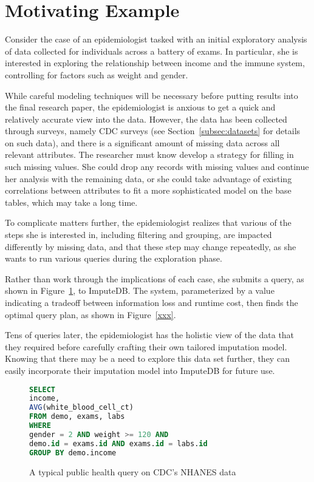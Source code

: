 \section{Motivating Example}
Consider the case of an epidemiologist tasked with an initial
exploratory analysis of data collected for individuals across
a battery of exams. In particular, she is interested in exploring
the relationship between income and the immune system,
controlling for factors such as weight and gender.

While careful modeling techniques will be necessary before putting
results into the final research paper, the epidemiologist is anxious
to get a quick and relatively accurate view into the data. However,
the data has been collected through surveys, namely CDC surveys (see Section~\ref{subsec:datasets} for details on such data),
and there is a significant amount of missing data across all
relevant attributes. The researcher must know develop a strategy
for filling in such missing values. She could drop any records with
missing values and continue her analysis with the remaining data,
or she could take advantage of existing correlations between attributes
to fit a more sophisticated model on the base tables, which may take
a long time. 

To complicate matters further, the epidemiologist realizes that
various of the steps she is interested in, including filtering and grouping,
are impacted differently by missing data, and that these step may change
repeatedly, as she wants to run various queries during the exploration phase.

Rather than work through
the implications of each case, she submits a query, as shown in Figure~\ref{fig:example-query}, to ImputeDB. The system, parameterized by a value indicating
a tradeoff between information loss and runtime cost, then finds
the optimal query plan, as shown in Figure~\ref{xxx}.

Tens of queries later, the epidemiologist has the holistic view of the
data that they required before carefully crafting their own tailored
imputation model. Knowing that there may be a need to explore
this data set further, they can easily incorporate their imputation model
into ImputeDB for future use.

\begin{figure}
\begin{lstlisting}[language=SQL]
SELECT
income,
AVG(white_blood_cell_ct)
FROM demo, exams, labs
WHERE 
gender = 2 AND weight >= 120 AND
demo.id = exams.id AND exams.id = labs.id
GROUP BY demo.income
\end{lstlisting}
\caption{A typical public health query on CDC's NHANES data}
\label{fig:example-query}
\end{figure}

